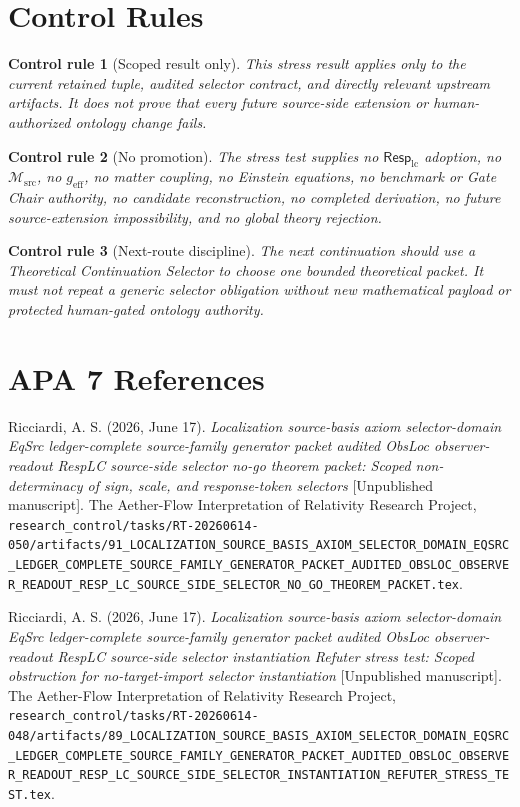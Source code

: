 \documentclass[11pt]{article}
\newcommand{\Msrc}{\mathcal{M}_{\mathrm{src}}}
\newcommand{\RespLC}{\mathsf{Resp}_{\mathrm{lc}}}
\newcommand{\geff}{g_{\mathrm{eff}}}
\newtheorem{controlrule}{Control rule}
\begin{document}
\section{Control Rules}

\begin{controlrule}[Scoped result only]
This stress result applies only to the current retained tuple,
audited selector contract, and directly relevant upstream artifacts.
It does not prove that every future source-side extension or
human-authorized ontology change fails.
\end{controlrule}

\begin{controlrule}[No promotion]
The stress test supplies no \(\RespLC\) adoption, no \(\Msrc\), no
\(\geff\), no matter coupling, no Einstein equations, no benchmark or
Gate Chair authority, no candidate reconstruction, no completed
derivation, no future source-extension impossibility, and no global
theory rejection.
\end{controlrule}

\begin{controlrule}[Next-route discipline]
The next continuation should use a Theoretical Continuation Selector
to choose one bounded theoretical packet. It must not repeat a generic
selector obligation without new mathematical payload or protected
human-gated ontology authority.
\end{controlrule}

\section*{APA 7 References}

Ricciardi, A. S. (2026, June 17). \emph{Localization source-basis
axiom selector-domain EqSrc ledger-complete source-family generator
packet audited ObsLoc observer-readout RespLC source-side selector
no-go theorem packet: Scoped non-determinacy of sign, scale, and
response-token selectors} [Unpublished manuscript]. The Aether-Flow
Interpretation of Relativity Research Project,
\texttt{research\_control/tasks/RT-20260614-050/artifacts/91\_LOCALIZATION\_SOURCE\_BASIS\_AXIOM\_SELECTOR\_DOMAIN\_EQSRC\_LEDGER\_COMPLETE\_SOURCE\_FAMILY\_GENERATOR\_PACKET\_AUDITED\_OBSLOC\_OBSERVER\_READOUT\_RESP\_LC\_SOURCE\_SIDE\_SELECTOR\_NO\_GO\_THEOREM\_PACKET.tex}.

Ricciardi, A. S. (2026, June 17). \emph{Localization source-basis
axiom selector-domain EqSrc ledger-complete source-family generator
packet audited ObsLoc observer-readout RespLC source-side selector
instantiation Refuter stress test: Scoped obstruction for
no-target-import selector instantiation} [Unpublished manuscript].
The Aether-Flow Interpretation of Relativity Research Project,
\texttt{research\_control/tasks/RT-20260614-048/artifacts/89\_LOCALIZATION\_SOURCE\_BASIS\_AXIOM\_SELECTOR\_DOMAIN\_EQSRC\_LEDGER\_COMPLETE\_SOURCE\_FAMILY\_GENERATOR\_PACKET\_AUDITED\_OBSLOC\_OBSERVER\_READOUT\_RESP\_LC\_SOURCE\_SIDE\_SELECTOR\_INSTANTIATION\_REFUTER\_STRESS\_TEST.tex}.
\end{document}

